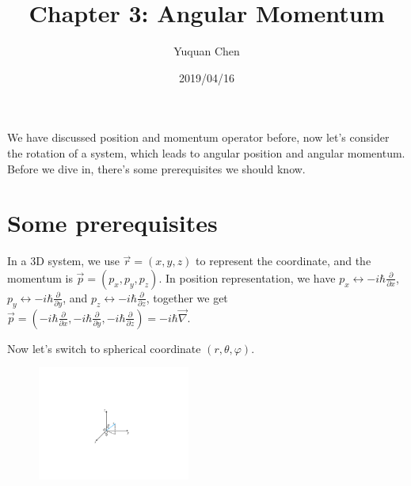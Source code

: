 \documentclass[UTF8,12pt]{article} %
\begin{document}
\title{Chapter 3: Angular Momentum}
\author{Yuquan Chen}
\date{2019/04/16} %
\maketitle

We have discussed position and momentum operator before, now let's consider the rotation of a system, which leads to angular position and angular momentum. Before we dive in, there's some prerequisites we should know.

\section{Some prerequisites}

In a 3D system, we use $\vec{r} = (x,y,z)$ to represent the coordinate, and the momentum is $\vec{p} = (p_{x}, p_{y}, p_{z})$. In position representation, we have $p_{x} \leftrightarrow -i\hbar \frac{\partial}{\partial x}$, $p_{y} \leftrightarrow -i\hbar \frac{\partial}{\partial y}$, and $p_{z} \leftrightarrow -i\hbar \frac{\partial}{\partial z}$, together we get $\vec{p} = (-i\hbar \frac{\partial}{\partial x}, -i\hbar \frac{\partial}{\partial y}, -i\hbar \frac{\partial}{\partial z}) = -i\hbar \vec{\nabla}$.

Now let's switch to spherical coordinate $(r, \theta, \varphi)$.
\begin{figure}[H]
\begin{center}
\includegraphics[width=5cm]{sph}
\end{center}
\end{figure}
\end{document}
